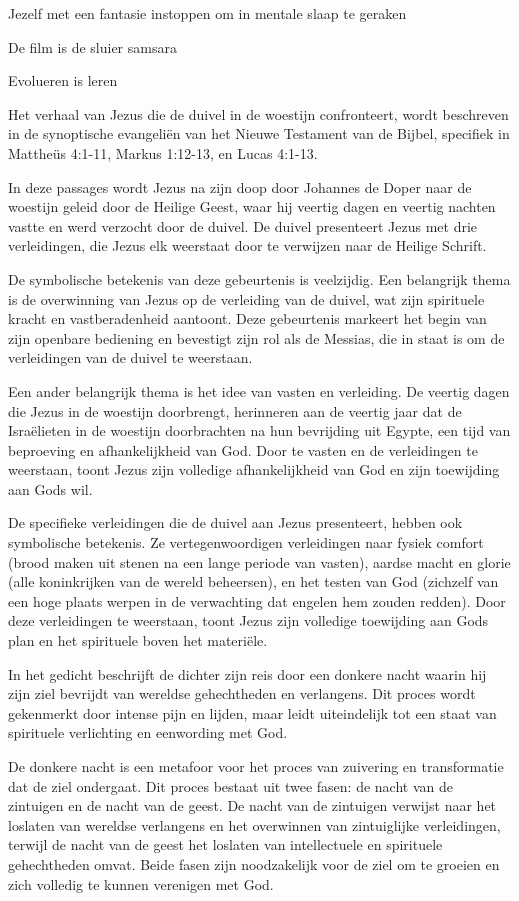 Jezelf met een fantasie instoppen om in mentale slaap te geraken

De film is de sluier samsara

Evolueren is leren

Het verhaal van Jezus die de duivel in de woestijn confronteert, wordt beschreven in de synoptische evangeliën van het Nieuwe Testament van de Bijbel, specifiek in Mattheüs 4:1-11, Markus 1:12-13, en Lucas 4:1-13.

In deze passages wordt Jezus na zijn doop door Johannes de Doper naar de woestijn geleid door de Heilige Geest, waar hij veertig dagen en veertig nachten vastte en werd verzocht door de duivel. De duivel presenteert Jezus met drie verleidingen, die Jezus elk weerstaat door te verwijzen naar de Heilige Schrift.

De symbolische betekenis van deze gebeurtenis is veelzijdig. Een belangrijk thema is de overwinning van Jezus op de verleiding van de duivel, wat zijn spirituele kracht en vastberadenheid aantoont. Deze gebeurtenis markeert het begin van zijn openbare bediening en bevestigt zijn rol als de Messias, die in staat is om de verleidingen van de duivel te weerstaan.

Een ander belangrijk thema is het idee van vasten en verleiding. De veertig dagen die Jezus in de woestijn doorbrengt, herinneren aan de veertig jaar dat de Israëlieten in de woestijn doorbrachten na hun bevrijding uit Egypte, een tijd van beproeving en afhankelijkheid van God. Door te vasten en de verleidingen te weerstaan, toont Jezus zijn volledige afhankelijkheid van God en zijn toewijding aan Gods wil.

De specifieke verleidingen die de duivel aan Jezus presenteert, hebben ook symbolische betekenis. Ze vertegenwoordigen verleidingen naar fysiek comfort (brood maken uit stenen na een lange periode van vasten), aardse macht en glorie (alle koninkrijken van de wereld beheersen), en het testen van God (zichzelf van een hoge plaats werpen in de verwachting dat engelen hem zouden redden). Door deze verleidingen te weerstaan, toont Jezus zijn volledige toewijding aan Gods plan en het spirituele boven het materiële.

In het gedicht beschrijft de dichter zijn reis door een donkere nacht waarin hij zijn ziel bevrijdt van wereldse gehechtheden en verlangens. Dit proces wordt gekenmerkt door intense pijn en lijden, maar leidt uiteindelijk tot een staat van spirituele verlichting en eenwording met God.

De donkere nacht is een metafoor voor het proces van zuivering en transformatie dat de ziel ondergaat. Dit proces bestaat uit twee fasen: de nacht van de zintuigen en de nacht van de geest. De nacht van de zintuigen verwijst naar het loslaten van wereldse verlangens en het overwinnen van zintuiglijke verleidingen, terwijl de nacht van de geest het loslaten van intellectuele en spirituele gehechtheden omvat. Beide fasen zijn noodzakelijk voor de ziel om te groeien en zich volledig te kunnen verenigen met God.

